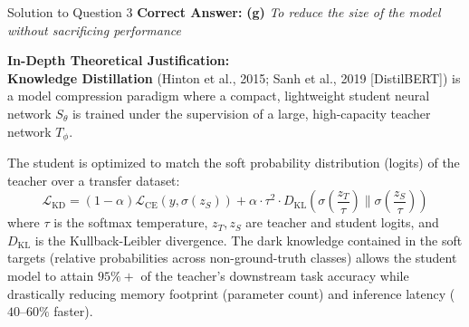 \documentclass[11pt,a4paper]{article}
\begin{document}
\begin{solutionbox}{Solution to Question 3}
\textbf{Correct Answer:} \textbf{(g)} \textit{To reduce the size of the model without sacrificing performance}

\medskip
\textbf{In-Depth Theoretical Justification:}\\
\textbf{Knowledge Distillation} (Hinton et al., 2015; Sanh et al., 2019 [DistilBERT]) is a model compression paradigm where a compact, lightweight student neural network $S_\theta$ is trained under the supervision of a large, high-capacity teacher network $T_\phi$.

The student is optimized to match the soft probability distribution (logits) of the teacher over a transfer dataset:
\begin{equation*}
\mathcal{L}_{\text{KD}} = (1 - \alpha) \mathcal{L}_{\text{CE}}(y, \sigma(z_S)) + \alpha \cdot \tau^2 \cdot D_{\text{KL}}\left(\sigma\left(\frac{z_T}{\tau}\right) \parallel \sigma\left(\frac{z_S}{\tau}\right)\right)
\end{equation*}
where $\tau$ is the softmax temperature, $z_T, z_S$ are teacher and student logits, and $D_{\text{KL}}$ is the Kullback-Leibler divergence. The dark knowledge contained in the soft targets (relative probabilities across non-ground-truth classes) allows the student model to attain $95\%+$ of the teacher's downstream task accuracy while drastically reducing memory footprint (parameter count) and inference latency ($40$--$60\%$ faster).


\end{solutionbox}
\end{document}
